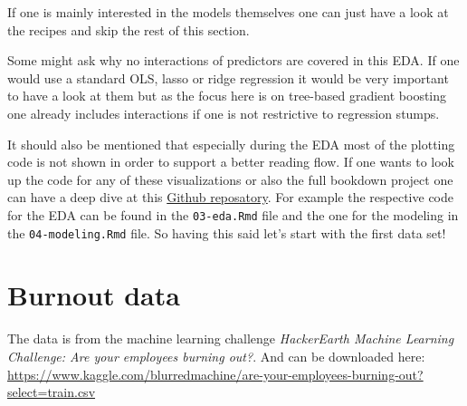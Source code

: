 \documentclass[
]{book}
\newenvironment{Shaded}{\begin{snugshade}}{\end{snugshade}}
\newcommand{\CommentTok}[1]{\textcolor[rgb]{0.56,0.35,0.01}{\textit{#1}}}
\newcommand{\FunctionTok}[1]{\textcolor[rgb]{0.00,0.00,0.00}{#1}}
\newcommand{\NormalTok}[1]{#1}
\newcommand{\OtherTok}[1]{\textcolor[rgb]{0.56,0.35,0.01}{#1}}
\newcommand{\SpecialCharTok}[1]{\textcolor[rgb]{0.00,0.00,0.00}{#1}}
\newcommand{\StringTok}[1]{\textcolor[rgb]{0.31,0.60,0.02}{#1}}
\begin{document}
If one is mainly interested in the models themselves one can just have a look at the recipes and skip the rest of this section.

Some might ask why no interactions of predictors are covered in this EDA. If one would use a standard OLS, lasso or ridge regression it would be very important to have a look at them but as the focus here is on tree-based gradient boosting one already includes interactions if one is not restrictive to regression stumps.

It should also be mentioned that especially during the EDA most of the plotting code is not shown in order to support a better reading flow. If one wants to look up the code for any of these visualizations or also the full bookdown project one can have a deep dive at this \href{https://github.com/EmanuelSommer/boosting_methods}{Github reposatory}. For example the respective code for the EDA can be found in the \texttt{03-eda.Rmd} file and the one for the modeling in the \texttt{04-modeling.Rmd} file. So having this said let's start with the first data set!

\hypertarget{burnout-data}{%
\section{Burnout data}\label{burnout-data}}

The data is from the machine learning challenge \emph{HackerEarth Machine Learning Challenge: Are your employees burning out?}. And can be downloaded here: \url{https://www.kaggle.com/blurredmachine/are-your-employees-burning-out?select=train.csv}

\begin{Shaded}
\end{Shaded}
\end{document}
